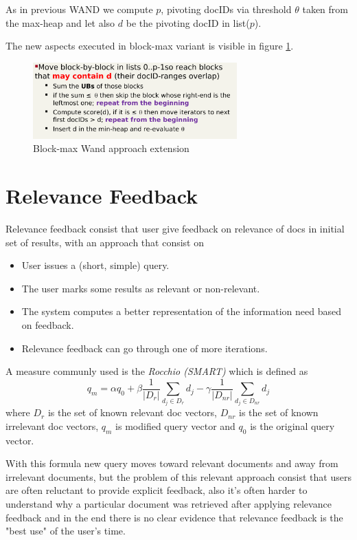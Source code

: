 As in previous WAND we compute $p$, pivoting docIDs via threshold $\theta$
taken from the max-heap and let also $d$ be the pivoting docID in list($p$).

The new aspects executed in block-max variant is visible in figure 
\ref{img:blockWand}.

\begin{figure}
	\includegraphics[width=0.7\textwidth]{Images/blockWand}
	\caption{Block-max Wand approach extension}
	\label{img:blockWand}
\end{figure}

\section{Relevance Feedback}
Relevance feedback consist that user give feedback on relevance of docs
in initial set of results, with an approach that consist on
\begin{itemize}
    \item User issues a (short, simple) query.
    \item The user marks some results as relevant or non-relevant.
    \item The system computes a better representation of the information
	  need based on feedback.
    \item Relevance feedback can go through one of more iterations.
\end{itemize}
A measure communly used is the \emph{Rocchio (SMART)} which is defined as
\[ q_m = \alpha q_0 + \beta \frac{1}{|D_r|} \sum _{d_j \in D_r} d_j -
         \gamma \frac{1}{|D_{nr}|} \sum _{d_j \in D_{nr}} d_j \]
where $D_r$ is the set of known relevant doc vectors, $D_{nr}$ is the 
set of known irrelevant doc vectors, $q_m$ is modified query vector
and $q_0$ is the original query vector.

With this formula new query moves toward relevant documents and away
from irrelevant documents, but the problem of this relevant approach 
consist that users are often reluctant to provide explicit feedback,
also it's often harder to understand why a particular document was retrieved
after applying relevance feedback and in the end there is no clear evidence
that relevance feedback is the "best use" of the user's time.

